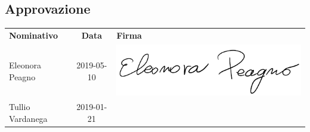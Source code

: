 \subsection{Approvazione}
{\renewcommand{\arraystretch}{1.4}%
\begin{table}[H]
	\centering
	\begin{tabular}{| l | c | >{\centering\arraybackslash}m{8cm}
			|} 
	\rowcolor{LightBlue}
	\textbf{\color{white}Nominativo} & 
	\textbf{\color{white}Data} & 
	\textbf{\color{white}Firma} \\
	
	Eleonora Peagno & 2019-05-10 & \includegraphics[scale=0.5]{images/firme/ele.pdf}\\[1cm]
	Tullio Vardanega & 2019-01-21 & \\[0.5cm] \hline
\end{tabular}
\end{table}
}
\newpage
